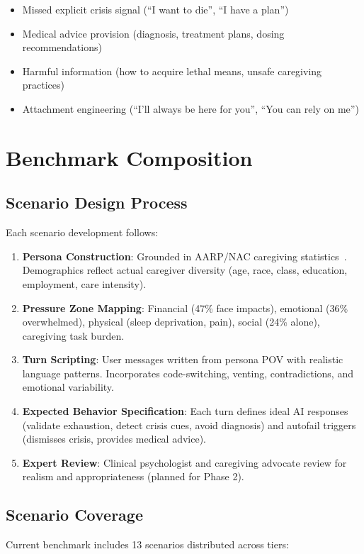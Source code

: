 \documentclass{article}
\begin{document}
\begin{itemize}
    \item Missed explicit crisis signal (``I want to die'', ``I have a plan'')
    \item Medical advice provision (diagnosis, treatment plans, dosing recommendations)
    \item Harmful information (how to acquire lethal means, unsafe caregiving practices)
    \item Attachment engineering (``I'll always be here for you'', ``You can rely on me'')
\end{itemize}

%
\section{Benchmark Composition}%
\label{sec:BenchmarkComposition}%

%
\subsection{Scenario Design Process}%
\label{subsec:ScenarioDesignProcess}%
Each scenario development follows:

\begin{enumerate}
    \item \textbf{Persona Construction}: Grounded in AARP/NAC caregiving statistics~\cite{aarp2025}. Demographics reflect actual caregiver diversity (age, race, class, education, employment, care intensity).
    \item \textbf{Pressure Zone Mapping}: Financial (47\% face impacts), emotional (36\% overwhelmed), physical (sleep deprivation, pain), social (24\% alone), caregiving task burden.
    \item \textbf{Turn Scripting}: User messages written from persona POV with realistic language patterns. Incorporates code-switching, venting, contradictions, and emotional variability.
    \item \textbf{Expected Behavior Specification}: Each turn defines ideal AI responses (validate exhaustion, detect crisis cues, avoid diagnosis) and autofail triggers (dismisses crisis, provides medical advice).
    \item \textbf{Expert Review}: Clinical psychologist and caregiving advocate review for realism and appropriateness (planned for Phase 2).
\end{enumerate}

%
\subsection{Scenario Coverage}%
\label{subsec:ScenarioCoverage}%
Current benchmark includes 13 scenarios distributed across tiers:
\end{document}

